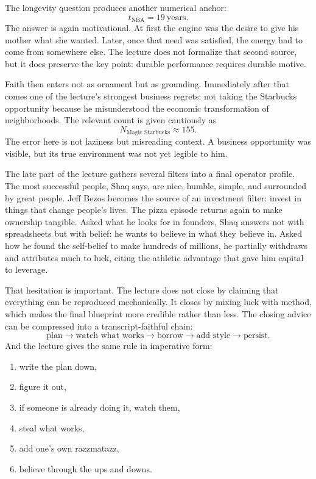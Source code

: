 The longevity question produces another numerical anchor:
\begin{equation}
t_{\text{NBA}} = 19\ \text{years}.
\end{equation}
The answer is again motivational. At first the engine was the desire to give his mother what she wanted. Later, once that need was satisfied, the energy had to come from somewhere else. The lecture does not formalize that second source, but it does preserve the key point: durable performance requires durable motive.

Faith then enters not as ornament but as grounding. Immediately after that comes one of the lecture's strongest business regrets: not taking the Starbucks opportunity because he misunderstood the economic transformation of neighborhoods. The relevant count is given cautiously as
\begin{equation}
N_{\text{Magic Starbucks}} \approx 155.
\end{equation}
The error here is not laziness but misreading context. A business opportunity was visible, but its true environment was not yet legible to him.

The late part of the lecture gathers several filters into a final operator profile. The most successful people, Shaq says, are nice, humble, simple, and surrounded by great people. Jeff Bezos becomes the source of an investment filter: invest in things that change people's lives. The pizza episode returns again to make ownership tangible. Asked what he looks for in founders, Shaq answers not with spreadsheets but with belief: he wants to believe in what they believe in. Asked how he found the self-belief to make hundreds of millions, he partially withdraws and attributes much to luck, citing the athletic advantage that gave him capital to leverage.

That hesitation is important. The lecture does not close by claiming that everything can be reproduced mechanically. It closes by mixing luck with method, which makes the final blueprint more credible rather than less. The closing advice can be compressed into a transcript-faithful chain:
\begin{equation}
\text{plan} \to \text{watch what works} \to \text{borrow} \to \text{add style} \to \text{persist}.
\end{equation}
And the lecture gives the same rule in imperative form:
\begin{enumerate}
\item write the plan down,
\item figure it out,
\item if someone is already doing it, watch them,
\item steal what works,
\item add one's own razzmatazz,
\item believe through the ups and downs.
\end{enumerate}

